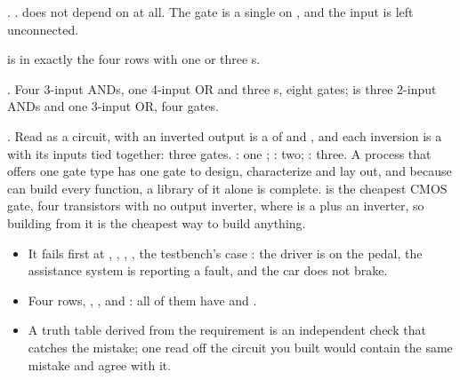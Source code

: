 

.
.
 does not depend on  at all. The gate is a single  on , and
the  input is left unconnected.

\par\smallskip
\noindent{} is  in exactly the four rows with one or three s.

.
Four 3-input ANDs, one 4-input OR and three s, eight gates;
 is three 2-input ANDs and one 3-input OR, four gates.

. Read as a circuit,  with an inverted output is a  of
 and , and each inversion is a  with its inputs tied together: three
 gates.
: one ; : two; : three.
A process that offers one gate type has one gate to design, characterize and lay out, and
because  can build every function, a library of it alone is complete.  is the
cheapest CMOS gate, four transistors with no output inverter, where  is a 
plus an inverter, so building from it is the cheapest way to build anything.

\begin{itemize}
  \item It fails first at , , ,
    , the testbench's case : the driver is on the pedal, the assistance
    system is reporting a fault, and the car does not brake.
  \item Four rows, , ,  and : all of them have
     and .
  \item A truth table derived from the requirement is an independent check that catches the
    mistake; one read off the circuit you built would contain the same mistake and agree with it.
\end{itemize}
